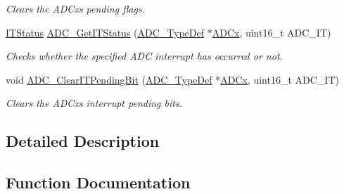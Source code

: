 \begin{DoxyCompactItemize}
\begin{DoxyCompactList}\small\item\em Clears the A\+D\+Cx\textquotesingle{}s pending flags. \end{DoxyCompactList}\item 
\mbox{\hyperlink{group___exported__types_gaacbd7ed539db0aacd973a0f6eca34074}{I\+T\+Status}} \mbox{\hyperlink{group___a_d_c___exported___functions_gaa1d3b910a83dbf14d4f68c8eef058612}{A\+D\+C\+\_\+\+Get\+I\+T\+Status}} (\mbox{\hyperlink{struct_a_d_c___type_def}{A\+D\+C\+\_\+\+Type\+Def}} $\ast$\mbox{\hyperlink{group___s_t_m32_f1_x_x___n_u_c_l_e_o___l_o_w___l_e_v_e_l___exported___constants_gab44c1065d38c298955fc028346984340}{A\+D\+Cx}}, uint16\+\_\+t A\+D\+C\+\_\+\+IT)
\begin{DoxyCompactList}\small\item\em Checks whether the specified A\+DC interrupt has occurred or not. \end{DoxyCompactList}\item 
void \mbox{\hyperlink{group___a_d_c___exported___functions_ga601c6a67bd883eb631ecc7aa5e999b9c}{A\+D\+C\+\_\+\+Clear\+I\+T\+Pending\+Bit}} (\mbox{\hyperlink{struct_a_d_c___type_def}{A\+D\+C\+\_\+\+Type\+Def}} $\ast$\mbox{\hyperlink{group___s_t_m32_f1_x_x___n_u_c_l_e_o___l_o_w___l_e_v_e_l___exported___constants_gab44c1065d38c298955fc028346984340}{A\+D\+Cx}}, uint16\+\_\+t A\+D\+C\+\_\+\+IT)
\begin{DoxyCompactList}\small\item\em Clears the A\+D\+Cx\textquotesingle{}s interrupt pending bits. \end{DoxyCompactList}\end{DoxyCompactItemize}


\subsection{Detailed Description}


\subsection{Function Documentation}
\mbox{\label{group___a_d_c___exported___functions_gad017d69bec6e497afd35ba25ea22d86e}} 
